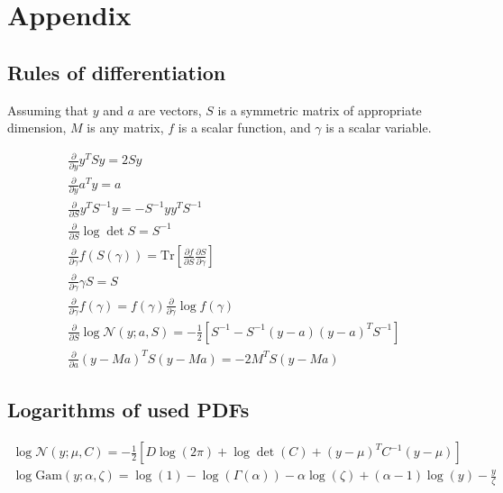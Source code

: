 \documentclass{paper}
\begin{document}
\section{Appendix}

\subsection{Rules of differentiation}

Assuming that $y$ and $a$ are vectors, $S$ is a symmetric matrix of appropriate dimension, $M$ is any matrix, $f$ is a scalar function, and $\gamma$ is a scalar variable.

\begin{eqnarray}
\frac{\partial}{\partial y} y^T S y = 2 S y \label{eq:deriv_quadratic} \\
\frac{\partial}{\partial y} a^T y = a \label{eq:deriv_scalarprod} \\
\frac{\partial}{\partial S} y^T S^{-1} y = - S^{-1} yy^T S^{-1} \label{eq:deriv_quad_mat} \\
\frac{\partial}{\partial S} \log \det S = S^{-1} \label{eq:deriv_logdet} \\
\frac{\partial}{\partial \gamma} f(S(\gamma)) = \textrm{Tr} \left[ \frac{\partial f}{\partial S} \frac{\partial S}{\partial \gamma} \right] \label{eq:deriv_chain} \\
\frac{\partial}{\partial \gamma} \gamma S = S \label{eq:deriv_scalar} \\
\frac{\partial}{\partial \gamma} f(\gamma) = f(\gamma) \frac{\partial}{\partial \gamma} \log f(\gamma) \label{eq:deriv_function} \\
\frac{\partial}{\partial S} \log \mathcal{N}(y;a,S) = -\frac{1}{2} \left[ S^{-1} - S^{-1}(y-a)(y-a)^TS^{-1} \right]\label{eq:deriv_gausscov} \\
\frac{\partial}{\partial a} (y-Ma)^T S (y-Ma) = -2 M^T S (y-Ma) \label{eq:quadderiv}
\end{eqnarray}


\subsection{Logarithms of used PDFs} \label{sec:logpdf}

\begin{eqnarray}
\log  \mathcal{N}(y;\mu,C) = -\frac{1}{2} \left[D \log (2\pi) + \log \det (C) + (y - \mu)^T C^{-1} (y-\mu) \right] \\
\log  \textrm{Gam}(y;\alpha,\zeta) = \log(1) - \log(\Gamma(\alpha)) - \alpha \log(\zeta) + (\alpha-1) \log(y) - \frac{y}{\zeta}
\end{eqnarray}
\end{document}
